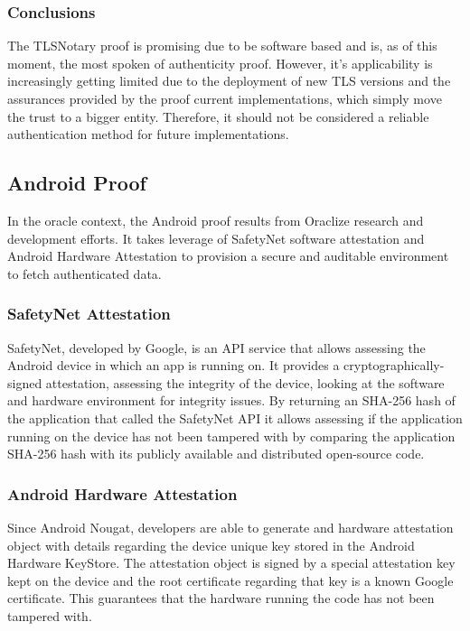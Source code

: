 \subsubsection{Conclusions}
The TLSNotary proof is promising due to be software based and is, as of this moment, the most spoken of authenticity proof. However, it's applicability is increasingly getting limited due to the deployment of new TLS versions and the assurances provided by the proof current implementations, which simply move the trust to a bigger entity. Therefore, it should not be considered a reliable authentication method for future implementations.

\subsection{Android Proof}
In the oracle context, the Android proof results from Oraclize research and development efforts. It takes leverage of SafetyNet software attestation and Android Hardware Attestation to provision a secure and auditable environment to fetch authenticated data. 

\subsubsection{SafetyNet Attestation}
SafetyNet, developed by Google, is an API service that allows assessing the Android device in which an app is running on. It provides a cryptographically-signed attestation, assessing the integrity of the device, looking at the software and hardware environment for integrity issues. By returning an SHA-256 hash of the application that called the SafetyNet API it allows assessing if the application running on the device has not been tampered with by comparing the application SHA-256 hash with its publicly available and distributed open-source code.

\subsubsection{Android Hardware Attestation}
Since Android Nougat, developers are able to generate and hardware attestation object with details regarding the device unique key stored in the Android Hardware KeyStore. The attestation object is signed by a special attestation key kept on the device and the root certificate regarding that key is a known Google certificate. This guarantees that the hardware running the code has not been tampered with.

